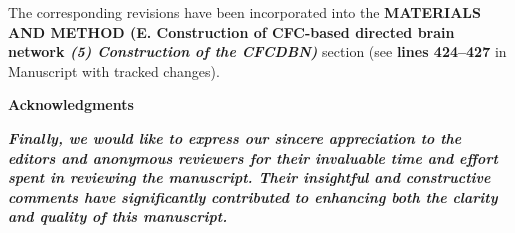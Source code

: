 \documentclass[12pt,technote,onecolumn]{IEEEtran}
\begin{document}
The corresponding revisions have been incorporated into the \textbf{MATERIALS AND METHOD (E. Construction of CFC-based directed brain network \textit{(5) Construction of the CFCDBN)}} section (see \textbf{lines 424–427} in Manuscript with tracked changes).
\vspace{10mm}


\begin{center}
    {\large \textbf{Acknowledgments}} \\[3mm]
    \begin{minipage}{0.9\textwidth}
   \textit{  \textbf{Finally, we would like to express our sincere appreciation to the editors and anonymous reviewers for their invaluable time and effort spent in reviewing the manuscript. Their insightful and constructive comments have significantly contributed to enhancing both the clarity and quality of this manuscript.}}
    \end{minipage}
\end{center}
\vspace{4mm}

\newpage
\clearpage

\begingroup
\let\uline\relax
\endgroup
\end{document}

